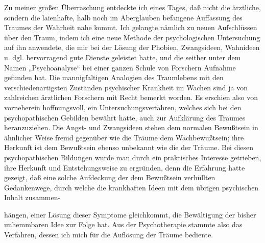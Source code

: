 \documentclass{article}
\begin{document}
            
        \pstart
        Zu meiner großen Überraschung entdeckte ich eines Tages, daß nicht die
               ärztliche, sondern die laienhafte, halb noch im Aberglauben befangene
               Auffassung des Traumes der Wahrheit nahe kommt. Ich gelangte nämlich zu neuen
               Aufschlüssen über den Traum, indem ich eine neue Methode der psychologischen
                  Untersuchung auf ihn anwendete, die mir bei der Lösung der
               Phobien, Zwangsideen, Wahnideen u. dgl. hervorragend gute Dienste geleistet
               hatte, und die seither unter dem Namen „Psychoanalyse“ bei einer ganzen Schule
               von Forschern Aufnahme gefunden hat. Die mannigfaltigen Analogien des
               Traumlebens mit den verschiedenartigsten Zuständen psychischer
               Krankheit im Wachen sind ja von zahlreichen ärztlichen Forschern mit Recht
               bemerkt worden. Es erschien also von vorneherein hoffnungsvoll, ein
               Untersuchungsverfahren, welches sich bei den psychopathischen Gebilden bewährt
               hatte, auch zur Aufklärung des Traumes heranzuziehen. Die Angst- und
               Zwangsideen stehen dem normalen Bewußtsein in ähnlicher Weise fremd gegenüber
               wie die Träume dem Wachbewußtsein; ihre Herkunft ist dem Bewußtsein ebenso
               unbekannt wie die der Träume. Bei diesen psychopathischen Bildungen wurde man
               durch ein praktisches Interesse getrieben, ihre Herkunft und Entstehungsweise zu
               ergründen, denn die Erfahrung hatte gezeigt, daß eine solche Aufdeckung der
               dem Bewußtsein verhüllten Gedankenwege, durch welche die krankhaften Ideen mit dem übrigen psychischen Inhalt zusammen-
        \pend
    
         
            
            
            
        \pstart
        hängen, einer Lösung dieser Symptome gleichkommt, die Bewältigung der bisher unhemmbaren Idee zur Folge hat. Aus der Psychotherapie
               stammte also das Verfahren, dessen ich mich für die Auflösung der Träume
               bediente.
        \pend
    
\end{document}
